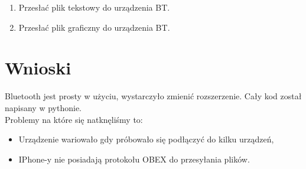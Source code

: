 \documentclass[a4paper,12pt]{extarticle}  %
\begin{document}
\begin{enumerate}
\begin{lstlisting}
	\end{lstlisting}
	\item Przesłać plik tekstowy do urządzenia BT.
	\begin{figure}[H]
	   \centering
	\end{figure}
	\item Przesłać plik graficzny do urządzenia BT.
	\begin{figure}[H]
	   \centering
	\end{figure}
\end{enumerate}
\section{Wnioski}
Bluetooth jest prosty w użyciu, wystarczyło zmienić rozszerzenie.
Cały kod został napisany w pythonie.\\
Problemy na które się natknęliśmy to:
\begin{itemize}
	\item Urządzenie wariowało gdy próbowało się podłączyć do kilku urządzeń,
	\item IPhone-y nie posiadają protokołu OBEX do przesyłania plików.
\end{itemize} 
\end{document}
